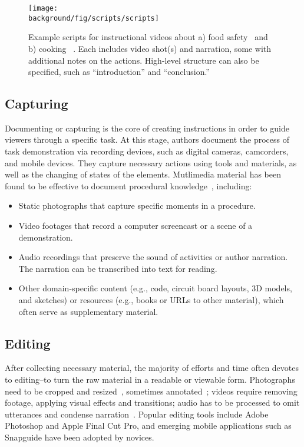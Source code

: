 \begin{figure*}[th!]
  \centering
  \texttt{[image: \\background/fig/scripts/scripts]}
  \caption{Example scripts for instructional videos about a) food safety~\protect\cite{WisconsinFoodSafetyScript} and b) cooking ~\protect\cite{SouthernIllinoisScript}. Each includes video shot(s) and narration, some with additional notes on the actions. High-level structure can also be specified, such as ``introduction'' and ``conclusion.''}
  \label{fig:background_scripts}
\end{figure*}

\subsection{Capturing}
Documenting or capturing is the core of creating instructions in order to guide viewers through a specific task. At this stage, authors document the process of task demonstration via recording devices, such as digital cameras, camcorders, and mobile devices. They capture necessary actions using tools and materials, as well as the changing of states of the elements. %
%
Mutlimedia material has been found to be effective to document procedural knowledge~\cite{Kuznetsov:2010:REA:1868914.1868950,Wakkary:2015:TAH:2702123.2702550}, including:

\begin{itemize}
  \item Static photographs that capture specific moments in a procedure.
  \item Video footages that record a computer screencast or a scene of a demonstration.
  \item Audio recordings that preserve the sound of activities or author narration. The narration can be transcribed into text for reading.
  \item Other domain-specific content (e.g., code, circuit board layouts, 3D models, and sketches) or resources (e.g., books or URLs to other material), which often serve as supplementary material.
\end{itemize}

\subsection{Editing}
After collecting necessary material, the majority of efforts and time often devotes to editing--to turn the raw material in a readable or viewable form.
Photographs need to be cropped and resized~\cite{Tseng:2014:PVP:2598510.2598540}, sometimes annotated~\cite{Torrey:2007he}; videos require removing footage, applying visual effects and transitions; audio has to be processed to omit utterances and condense narration~\cite{Chi:2013:DGC:2501988.2502052}. Popular editing tools include Adobe Photoshop and Apple Final Cut Pro, and emerging mobile applications such as Snapguide have been adopted by novices.

